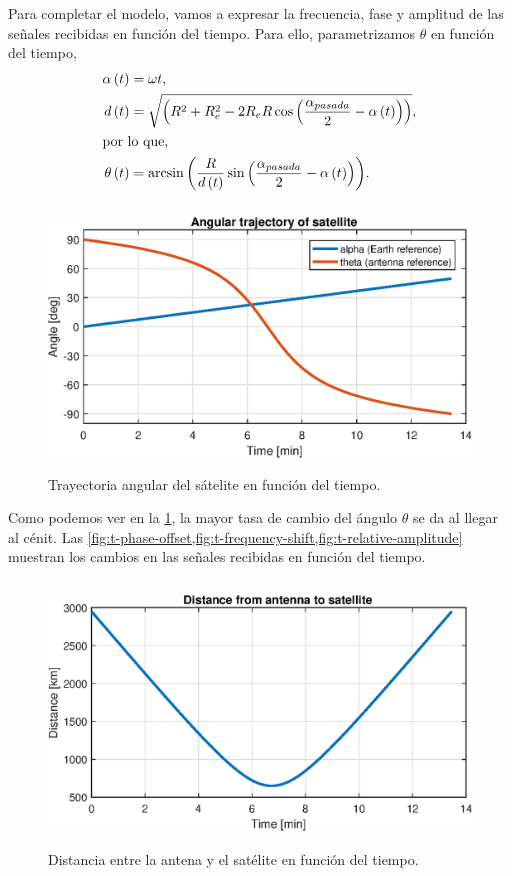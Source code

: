 \documentclass{article}
\newenvironment{standalone}{\begin{preview}}{\end{preview}}
\begin{document}
\begin{standalone}
  Para completar el modelo, vamos a expresar la frecuencia, fase y amplitud de las señales recibidas en función del tiempo.
  Para ello, parametrizamos $\theta$ en función del tiempo,
  \begin{align}
    \alpha \left( t \right) &= \omega t, \\
    d \left( t \right) &= \sqrt{ \left( R^2 + R_e^2 - 2 R_e R \cos{ \left( \frac{\alpha_{pasada}}{2} - \alpha \left( t \right) \right) } \right) }, \\
    \intertext{por lo que,}
    \theta \left( t \right) &= \arcsin{ \left( \frac{R}{d \left( t \right) } \sin{ \left( \frac{\alpha_{pasada}}{2} - \alpha \left( t \right) \right) } \right) }.
  \end{align}

  \begin{figure}[!htbp]
    \centering
    \includegraphics[width=\linewidth, height=70mm, keepaspectratio]{../images/angular-trajectory-satellite.eps}
    \caption{Trayectoria angular del sátelite en función del tiempo.}
    \label{fig:angular-trajectory-satellite}
  \end{figure}

  Como podemos ver en la \cref{fig:angular-trajectory-satellite}, la mayor tasa de cambio del ángulo $\theta$ se da al llegar al cénit.
  Las \cref{fig:t-phase-offset,fig:t-frequency-shift,fig:t-relative-amplitude} muestran los cambios en las señales recibidas en función del tiempo.

  \begin{figure}[!htbp]
    \centering
    \includegraphics[width=\linewidth, height=70mm, keepaspectratio]{../images/t-distance-antenna-satellite.eps}
    \caption{Distancia entre la antena y el satélite en función del tiempo.}
    \label{fig:t-distance-antenna-satellite}
  \end{figure}


\end{standalone}
\end{document}
